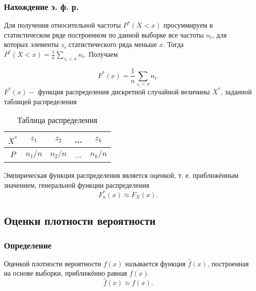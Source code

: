 \documentclass[main.tex]{subfiles}
\begin{document}
    \subsubsection{Нахождение э. ф. р.}
    \noindent Для получения относительной частоты $P^*(X < x)$ просуммируем в статистическом ряде построенном по данной выборке все частоты $n_i$, для которых элементы $z_i$ статистического ряда меньше $x$. Тогда $P^*(X < x) = \frac{1}{n}\sum_{z_i<x}n_i$. Получаем   

    \begin{equation} \label{empiricalFunc:EFD}
    	F^*(x)=\frac{1}{n}\sum_{z_i<x}n_i.
    \end{equation}
        $F^*(x)-$ функция распределения дискретной случайной величины $X^*$, заданной таблицей распределения
    \begin{table}[H]
	    \centering
	\begin{tabular}{|c|c|c|c|c|}
	    	\hline
	    	$X^*$&$z_1$&$z_2$&...&$z_k$\\
	    	\hline
	    	$P$&$n_1/n$&$n_2/n$&...&$n_k/n$\\
	    	\hline
	    \end{tabular}
    	\caption{Таблица распределения}
    	\label{tab:my_label}
    \end{table}
    
    \noindent Эмпирическая функция распределения является оценкой, т. е. приближённым значением, генеральной функции распределения
    \begin{equation} \label{empiricalFunc:approx}
    	F_n^*(x)\approx F_X(x).
    \end{equation}


    \subsection{Оценки плотности вероятности}
    \subsubsection{Определение}
    \noindent Оценкой плотности вероятности $f(x)$ называется функция $\widehat{f}(x)$, построенная на основе выборки, приближённо равная $f(x)$
    \begin{equation} \label{densityEstim}
    	\widehat{f}(x)\approx f(x).
    \end{equation}
\end{document}
